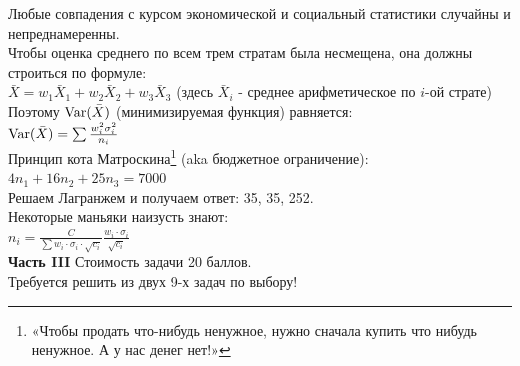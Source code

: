 \documentclass[12pt, a4paper]{article}\usepackage[]{graphicx}\usepackage[]{color}
\begin{document}
	Любые совпадения с курсом экономической и социальный статистики случайны и непреднамеренны. \\
	Чтобы оценка среднего по всем трем стратам была несмещена, она должны строиться по формуле: \\
	$\bar{X}=w_{1}\bar{X}_{1}+w_{2}\bar{X}_{2}+w_{3}\bar{X}_{3}$ (здесь $\bar{X}_{i}$ - среднее арифметическое по $i$-ой страте) \\
	Поэтому $\operatorname{Var}(\bar{X})$ (минимизируемая функция) равняется: \\
	$\operatorname{Var}(\bar{X})=\sum \frac{w^{2}_{i}\sigma^{2}_{i}}{n_{i}}$ \\
	Принцип кота Матроскина\footnote{«Чтобы продать что-нибудь ненужное, нужно сначала купить что нибудь ненужное. А у нас денег нет!»} (aka бюджетное ограничение):  $4n_{1}+16n_{2}+25n_{3}=7000$ \\
	Решаем Лагранжем и получаем ответ: 35, 35, 252. \\
	Некоторые маньяки наизусть знают: \\
	$n_{i}=\frac{C}{\sum w_{i}\cdot \sigma_{i}\cdot\sqrt{c_{i}}}\frac{w_{i}\cdot \sigma_{i}}{\sqrt{c_{i}}}$\\






	\textbf{Часть III} Стоимость задачи 20 баллов. \\

	Требуется решить \textbf{} из двух 9-х задач по
	выбору! \\
\end{document}

